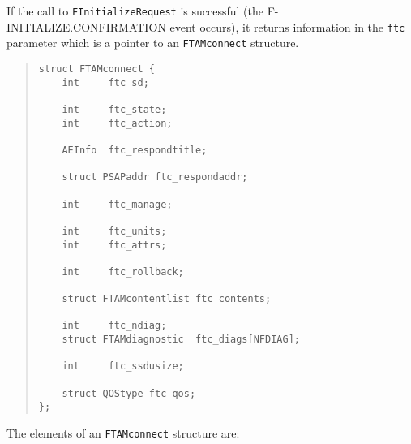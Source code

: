 If the call to \verb"FInitializeRequest" is successful
(the {\sf F-INITIALIZE.CON\-FIR\-MA\-TION\/} event occurs),
it returns information in the \verb"ftc" parameter
which is a pointer to an \verb"FTAMconnect" structure.
\begin{quote}\small\begin{verbatim}
struct FTAMconnect {
    int	    ftc_sd;

    int	    ftc_state;
    int	    ftc_action;

    AEInfo  ftc_respondtitle;

    struct PSAPaddr ftc_respondaddr;

    int	    ftc_manage;

    int	    ftc_units;
    int	    ftc_attrs;

    int	    ftc_rollback;

    struct FTAMcontentlist ftc_contents;

    int	    ftc_ndiag;
    struct FTAMdiagnostic  ftc_diags[NFDIAG];

    int	    ftc_ssdusize;

    struct QOStype ftc_qos;
};
\end{verbatim}\end{quote}
The elements of an \verb"FTAMconnect" structure are:
